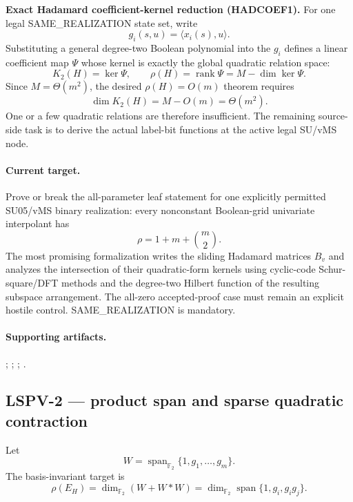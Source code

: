 \documentclass[11pt]{article}
\newcommand{\Ftwo}{\mathbb{F}_2}
\begin{document}
\begin{provedbox}
\textbf{Exact Hadamard coefficient-kernel reduction (HADCOEF1).}
For one legal SAME_REALIZATION state set, write
\[g_i(s,u)=\langle x_i(s),u\rangle.\]
Substituting a general degree-two Boolean polynomial into the \(g_i\) defines a linear
coefficient map \(\Psi\) whose kernel is exactly the global quadratic relation space:
\[
\boxed{K_2(H)=\ker\Psi,\qquad \rho(H)=\operatorname{rank}\Psi=M-\dim\ker\Psi.}
\]
Since \(M=\Theta(m^2)\), the desired \(\rho(H)=O(m)\) theorem requires
\[
\boxed{\dim K_2(H)=M-O(m)=\Theta(m^2).}
\]
One or a few quadratic relations are therefore insufficient. The remaining source-side task is
to derive the actual label-bit functions at the active legal SU/vMS node.
\end{provedbox}
\paragraph{Current target.}
Prove or break the all-parameter leaf statement for one explicitly permitted SU05/vMS binary
realization: every nonconstant Boolean-grid univariate interpolant has
\[
\rho=1+m+\binom m2.
\]
The most promising formalization writes the sliding Hadamard matrices $B_v$ and analyzes the
intersection of their quadratic-form kernels using cyclic-code Schur-square/DFT methods and the
degree-two Hilbert function of the resulting subspace arrangement. The all-zero accepted-proof
case must remain an explicit hostile control. SAME\_REALIZATION is mandatory.

\paragraph{Supporting artifacts.}
;
;
;
.

\subsection{LSPV-2 --- product span and sparse quadratic contraction}

Let
\[
W=\operatorname{span}_{\Ftwo}\{1,g_1,\ldots,g_m\}.
\]
The basis-invariant target is
\[
\rho(E_H)
=
\dim_{\Ftwo}(W+W\!\ast\! W)
=
\dim_{\Ftwo}\operatorname{span}\{1,g_i,g_i g_j\}.
\]
\end{document}
